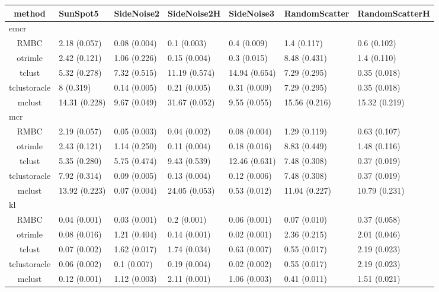 \captionsetup[table]{labelformat=empty,skip=1pt}
\begin{longtable}{cllllll}
\toprule
method & SunSpot5 & SideNoise2 & SideNoise2H & SideNoise3 & RandomScatter & RandomScatterH \\ 
\midrule
\multicolumn{1}{l}{emcr} \\ 
\midrule
RMBC & 2.18 (0.057) & 0.08 (0.004) & 0.1 (0.003) & 0.4 (0.009) & 1.4 (0.117) & 0.6 (0.102) \\ 
otrimle & 2.42 (0.121) & 1.06 (0.226) & 0.15 (0.004) & 0.3 (0.015) & 8.48 (0.431) & 1.4 (0.110) \\ 
tclust & 5.32 (0.278) & 7.32 (0.515) & 11.19 (0.574) & 14.94 (0.654) & 7.29 (0.295) & 0.35 (0.018) \\ 
tclustoracle & 8 (0.319) & 0.14 (0.005) & 0.21 (0.005) & 0.31 (0.009) & 7.29 (0.295) & 0.35 (0.018) \\ 
mclust & 14.31 (0.228) & 9.67 (0.049) & 31.67 (0.052) & 9.55 (0.055) & 15.56 (0.216) & 15.32 (0.219) \\ 
\midrule
\multicolumn{1}{l}{mcr} \\ 
\midrule
RMBC & 2.19 (0.057) & 0.05 (0.003) & 0.04 (0.002) & 0.08 (0.004) & 1.29 (0.119) & 0.63 (0.107) \\ 
otrimle & 2.43 (0.121) & 1.14 (0.250) & 0.11 (0.004) & 0.18 (0.016) & 8.83 (0.449) & 1.48 (0.116) \\ 
tclust & 5.35 (0.280) & 5.75 (0.474) & 9.43 (0.539) & 12.46 (0.631) & 7.48 (0.308) & 0.37 (0.019) \\ 
tclustoracle & 7.92 (0.314) & 0.09 (0.005) & 0.13 (0.004) & 0.12 (0.006) & 7.48 (0.308) & 0.37 (0.019) \\ 
mclust & 13.92 (0.223) & 0.07 (0.004) & 24.05 (0.053) & 0.53 (0.012) & 11.04 (0.227) & 10.79 (0.231) \\ 
\midrule
\multicolumn{1}{l}{kl} \\ 
\midrule
RMBC & 0.04 (0.001) & 0.03 (0.001) & 0.2 (0.001) & 0.06 (0.001) & 0.07 (0.010) & 0.37 (0.058) \\ 
otrimle & 0.08 (0.016) & 1.21 (0.404) & 0.14 (0.001) & 0.02 (0.001) & 2.36 (0.215) & 2.01 (0.046) \\ 
tclust & 0.07 (0.002) & 1.62 (0.017) & 1.74 (0.034) & 0.63 (0.007) & 0.55 (0.017) & 2.19 (0.023) \\ 
tclustoracle & 0.06 (0.002) & 0.1 (0.007) & 0.19 (0.004) & 0.02 (0.002) & 0.55 (0.017) & 2.19 (0.023) \\ 
mclust & 0.12 (0.001) & 1.12 (0.003) & 2.11 (0.001) & 1.06 (0.003) & 0.41 (0.011) & 1.51 (0.021) \\ 

\end{longtable}
